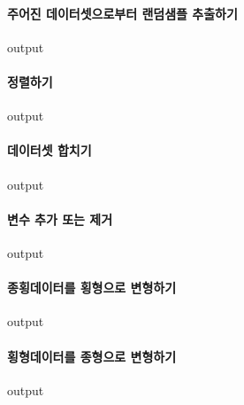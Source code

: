 \documentclass{book}
\begin{document}
\paragraph{주어진 데이터셋으로부터 랜덤샘플 추출하기}
\begin{Schunk}
\begin{Soutput}
output
\end{Soutput}
\end{Schunk}

\paragraph{정렬하기}
\begin{Schunk}
\begin{Soutput}
output
\end{Soutput}
\end{Schunk}

\paragraph{데이터셋 합치기}
\begin{Schunk}
\begin{Soutput}
output
\end{Soutput}
\end{Schunk}

\paragraph{변수 추가 또는 제거}
\begin{Schunk}
\begin{Soutput}
output
\end{Soutput}
\end{Schunk}

\paragraph{종횡데이터를 횡형으로 변형하기}
\begin{Schunk}
\begin{Soutput}
output
\end{Soutput}
\end{Schunk}

\paragraph{횡형데이터를 종형으로 변형하기}
\begin{Schunk}
\begin{Soutput}
output
\end{Soutput}
\end{Schunk}
\end{document}
